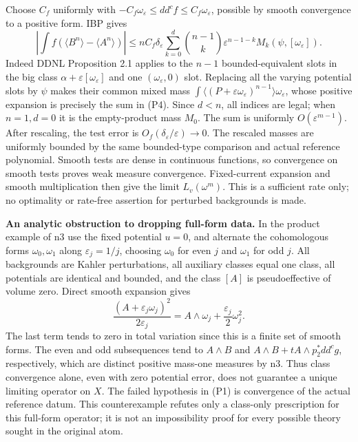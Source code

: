 \documentclass[
  11pt,
]{article}
\begin{document}
Choose \(C_f\) uniformly with
\(-C_f\omega_\varepsilon\leq dd^cf\leq C_f\omega_\varepsilon\), possible
by smooth convergence to a positive form. IBP gives \[
\left|\int f(\langle B^n\rangle-\langle A^n\rangle)\right|
\leq nC_f\delta_\varepsilon
\sum_{k=0}^d\binom{n-1}k\varepsilon^{n-1-k}M_k(\psi,[\omega_\varepsilon]). \tag{P4}
\] Indeed DDNL Proposition 2.1 applies to the \(n-1\) bounded-equivalent
slots in the big class \(\alpha+\varepsilon[\omega_\varepsilon]\) and
one \((\omega_\varepsilon,0)\) slot. Replacing all the varying potential
slots by \(\psi\) makes their common mixed mass
\(\int\langle(P+\varepsilon\omega_\varepsilon)^{n-1}\rangle\omega_\varepsilon\),
whose positive expansion is precisely the sum in (P4). Since \(d<n\),
all indices are legal; when \(n=1,d=0\) it is the empty-product mass
\(M_0\). The sum is uniformly \(O(\varepsilon^{m-1})\). After rescaling,
the test error is \(O_f(\delta_\varepsilon/\varepsilon)\to0\). The
rescaled masses are uniformly bounded by the same bounded-type
comparison and actual reference polynomial. Smooth tests are dense in
continuous functions, so convergence on smooth tests proves weak measure
convergence. Fixed-current expansion and smooth multiplication then give
the limit \(L_v(\omega^m)\). This is a sufficient rate only; no
optimality or rate-free assertion for perturbed backgrounds is made.

\textbf{An analytic obstruction to dropping full-form data.} In the
product example of n3 use the fixed potential \(u=0\), and alternate the
cohomologous forms \(\omega_0,\omega_1\) along \(\varepsilon_j=1/j\),
choosing \(\omega_0\) for even \(j\) and \(\omega_1\) for odd \(j\). All
backgrounds are Kahler perturbations, all auxiliary classes equal one
class, all potentials are identical and bounded, and the class \([A]\)
is pseudoeffective of volume zero. Direct smooth expansion gives \[
\frac{(A+\varepsilon_j\omega_j)^2}{2\varepsilon_j}
=A\wedge\omega_j+\frac{\varepsilon_j}{2}\omega_j^2.
\] The last term tends to zero in total variation since this is a finite
set of smooth forms. The even and odd subsequences tend to \(A\wedge B\)
and \(A\wedge B+tA\wedge p_2^*dd^cg\), respectively, which are distinct
positive mass-one measures by n3. Thus class convergence alone, even
with zero potential error, does not guarantee a unique limiting operator
on \(X\). The failed hypothesis in (P1) is convergence of the actual
reference datum. This counterexample refutes only a class-only
prescription for this full-form operator; it is not an impossibility
proof for every possible theory sought in the original atom.
\end{document}
